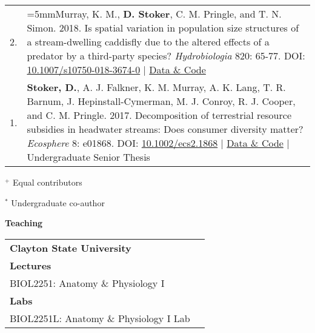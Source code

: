 \documentclass[letterpaper,11pt,oneside]{article}
\begin{document}
\begin{longtable}{@{} p{0.5cm} >{\raggedright\arraybackslash}p{16.7cm}}
2. & \hangindent=5mmMurray, K. M., \textbf{D. Stoker}, C. M. Pringle, and T. N. Simon. 2018. Is spatial variation in population size structures of a stream-dwelling caddisfly due to the altered effects of a predator by a third-party species? \textit{Hydrobiologia} 820: 65-77. DOI: {\href{https://link.springer.com/article/10.1007/s10750-018-3674-0}{10.1007/s10750-018-3674-0}} | {\href{https://doi.org/10.6084/m9.figshare.5856651.v1}{Data \& Code}} \\
1. & \hangindent=5mm\textbf{Stoker, D.}, A. J. Falkner, K. M. Murray, A. K. Lang, T. R. Barnum, J. Hepinstall-Cymerman, M. J. Conroy, R. J. Cooper, and C. M. Pringle. 2017. Decomposition of terrestrial resource subsidies in headwater streams: Does consumer diversity matter? \textit{Ecosphere} 8: e01868. DOI: {\href{https://esajournals.onlinelibrary.wiley.com/doi/full/10.1002/ecs2.1868}{10.1002/ecs2.1868}} | {\href{https://doi.org/10.6084/m9.figshare.6025811.v1}{Data \& Code}} | Undergraduate Senior Thesis \\
\end{longtable}

 \smallskip
 \noindent $^{+}$ Equal contributors
 
 \smallskip
 \noindent $^{*}$ Undergraduate co-author

\bigskip












\newpage

\noindent\Large{\textbf{Teaching}}
\normalsize


\def\arraystretch{1.1}
\begin{longtable}{@{} >{\raggedright\arraybackslash}p{15.5cm} >{\raggedright\arraybackslash}p{1.7cm}}


\textbf{Clayton State University} & \\
\textbf{Lectures} \\
\hspace{10mm} BIOL2251: Anatomy \& Physiology I  & 2024 \\
 
\smallskip
 
\textbf{Labs} \\
\hspace{10mm} BIOL2251L: Anatomy \& Physiology I Lab & 2024 \\

  
\end{longtable}
\end{document}
